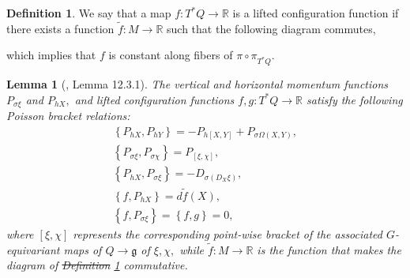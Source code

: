 \documentclass[12pt, letterpaper, reqno]{amsart}
\theoremstyle{definition}
\newtheorem{df}{Definition}
\theoremstyle{plain}
\newtheorem{lm}{Lemma}
\theoremstyle{remark}
\providecommand{\DIFadd}[1]{{\protect\color{blue}\uwave{#1}}} %
\providecommand{\DIFdel}[1]{{\protect\color{red}\sout{#1}}}                      %
\providecommand{\DIFaddbegin}{} %
\providecommand{\DIFaddend}{} %
\providecommand{\DIFdelbegin}{} %
\providecommand{\DIFdelend}{} %
\newcommand{\DIFscaledelfig}{0.5}
\newlength{\DIFdelgraphicswidth} %
\newlength{\DIFdelgraphicsheight} %
\newcommand{\DIFaddincludegraphics}[2][]{{\color{blue}\fbox{\DIFOincludegraphics[#1]{#2}}}} %
\newcommand{\DIFdelincludegraphics}[2][]{%
\sbox{\DIFdelgraphicsbox}{\DIFOincludegraphics[#1]{#2}}%
\settoboxwidth{\DIFdelgraphicswidth}{\DIFdelgraphicsbox} %
\settoboxtotalheight{\DIFdelgraphicsheight}{\DIFdelgraphicsbox} %
\scalebox{\DIFscaledelfig}{%
\parbox[b]{\DIFdelgraphicswidth}{\usebox{\DIFdelgraphicsbox}\\[-\baselineskip] \rule{\DIFdelgraphicswidth}{0em}}\llap{\resizebox{\DIFdelgraphicswidth}{\DIFdelgraphicsheight}{%
\setlength{\unitlength}{\DIFdelgraphicswidth}%
\begin{picture}(1,1)%
\thicklines\linethickness{2pt} %
{\color[rgb]{1,0,0}\put(0,0){\framebox(1,1){}}}%
{\color[rgb]{1,0,0}\put(0,0){\line( 1,1){1}}}%
{\color[rgb]{1,0,0}\put(0,1){\line(1,-1){1}}}%
\end{picture}%
}\hspace*{3pt}}} %
} %
\DeclareRobustCommand{\DIFaddbegin}{\DIFOaddbegin \let\includegraphics\DIFaddincludegraphics} %
\DeclareRobustCommand{\DIFaddend}{\DIFOaddend \let\includegraphics\DIFOincludegraphics} %
\DeclareRobustCommand{\DIFdelbegin}{\DIFOdelbegin \let\includegraphics\DIFdelincludegraphics} %
\DeclareRobustCommand{\DIFdelend}{\DIFOaddend \let\includegraphics\DIFOincludegraphics} %
\begin{document}
\begin{df}\label{df:lifted_configuration_function}
	We say that a map $ f: T^*Q \rightarrow \mathbb{R} $ is a lifted configuration function if there exists a function $ \tilde f: M \rightarrow \mathbb{R} $ such that the following diagram commutes,
	\begin{center}
	\end{center}
	which implies that $ f $ is constant along fibers of $ \pi\circ \pi_{T^*Q}. $ 
\end{df}
\begin{lm}[\cite{montgomery2002tour}, Lemma 12.3.1]
	The vertical and horizontal momentum functions $ P_{\sigma\xi} $ and $ P_{hX}, $ and lifted configuration functions $ f,g: T^*Q \rightarrow \mathbb{R} $ satisfy the following Poisson bracket relations: 	
	\begin{align}
		\left\{ P_{hX}, P_{hY} \right\} = -P_{h[X,Y]}+P_{\sigma\Omega(X,Y)},\label{eq:lemma_1}\\ 
	\left\{ P_{\sigma \xi}, P_{\sigma\chi} \right\} = P_{[\xi, \chi]},\\
	\left\{ P_{hX}, P_{\sigma\xi} \right\} = -D_{\sigma(D_X\xi)},\\
	\left\{ f, P_{hX} \right\} = d\tilde f(X),\\ \label{eq:lemma_4}
	\left\{ f, P_{\sigma\xi} \right\} = \left\{ f,g \right\} =0,
	\end{align}
	where $\left[ \xi, \chi \right]$ 	represents the corresponding point-wise bracket of the associated $ G $-equivariant maps of $ Q \rightarrow \mathfrak{g} $ of $ \xi,\chi, $ while $ \tilde f : M \rightarrow \mathbb{R} $ is the function that makes the diagram of \DIFdelbegin \DIFdel{Definition }\DIFdelend \DIFaddbegin \DIFadd{definition }\DIFaddend \ref{df:lifted_configuration_function} commutative.
\end{lm}
\end{document}
